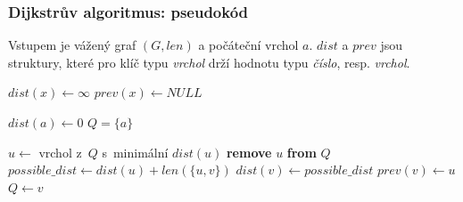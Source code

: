 \documentclass[10pt,xcolor=pdflatex,hyperref={unicode,hidelinks}]{beamer}
\begin{document}
\begin{frame}\frametitle{Dijkstrův algoritmus: pseudokód}
    Vstupem je vážený graf $(G, len)$ a počáteční vrchol $a$. $dist$ a $prev$ jsou struktury, které pro klíč typu \textit{vrchol} drží hodnotu typu \textit{číslo}, resp. \textit{vrchol}.
    \begin{algorithmic}[1]
            \State $dist(x)\gets \infty$
            \State $prev(x)\gets NULL$
        \EndFor
        
        \State $dist(a)\gets 0$
        \State $Q = \{a\}$
        
            \State $u\gets$ vrchol z~$Q$ s~minimální $dist(u)$
            \State \textbf{remove} $u$ \textbf{from} $Q$\label{dijkstra_stop}
                \State $possible\_dist \gets dist(u) + len(\{u, v\})$ 
                    \State $dist(v) \gets possible\_dist$
                    \State $prev(v) \gets u$
                    \State $Q \gets v$
                \EndIf
            \EndFor
        \EndWhile
    \end{algorithmic}
\end{frame}
\end{document}
